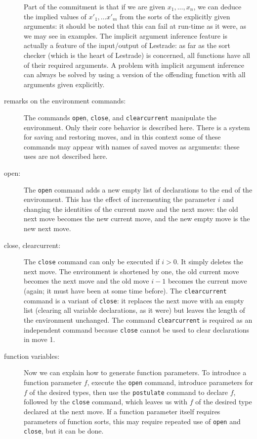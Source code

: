 \documentclass[12pt]{article}
\begin{document}
\begin{description}
Part of the commitment is that if we are given $x_1,\ldots,x_n$, we can deduce the implied values of $x'_1,\ldots x'_m$ from the sorts of the explicitly given arguments:  it should be noted that this can fail at run-time as it were, as we may see in examples. The implicit argument inference feature is actually a feature of the input/output of Lestrade:  as far as the sort checker (which is the heart of Lestrade)  is concerned, all functions have all of their required arguments.  A problem with implicit argument inference can always be solved by using a version of the offending function with all arguments given explicitly.

\item[remarks on the environment commands:]  The commands {\tt open}, {\tt close}, and {\tt clearcurrent} manipulate the environment.  Only their core behavior is described here.   There is a system for saving and restoring moves, and in this context some of these commands may appear with names of saved moves as arguments:  these uses are not described here.

\item[open:]  The {\tt open} command adds a new empty list of declarations to the end of the environment.  This has the effect of incrementing the parameter $i$
and changing the identities of the current move and the next move:  the old next move becomes the new current move, and the new empty move is the new next move.

\item[close, clearcurrent:]  The {\tt close} command can only be executed if $i>0$.  It simply deletes the next move.  The environment is shortened by one, the old current move becomes the next move and the old move $i-1$ becomes the current move (again;  it must have been at some time before).  The {\tt clearcurrent} command is a variant of {\tt close}:  it replaces the next move with an empty list (clearing all variable declarations, as it were) but leaves the length of the environment unchanged.  The command {\tt clearcurrent} is required as an independent command because {\tt close} cannot be used to clear declarations  in move 1.

\item[function variables:]  Now we can explain how to generate function parameters.   To introduce a function parameter $f$, execute the {\tt open} command, introduce parameters for $f$ of the desired types, then use the {\tt postulate} command to declare $f$, followed by the {\tt close} command, which leaves us with $f$ of the desired type declared at the next move.  If a function parameter itself requires parameters of function sorts, this may require repeated use of {\tt open} and  {\tt close}, but it can be done.


\end{description}
\end{document}
